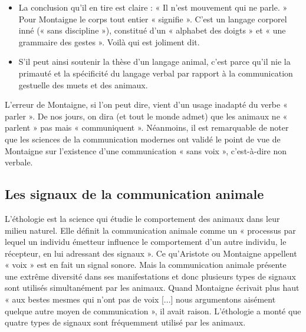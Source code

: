 \begin{itemize}
\item La conclusion qu’il en tire est claire : « Il n’est mouvement qui ne parle. » Pour Montaigne le corps tout entier « signifie ». C’est un langage corporel inné (« sans discipline »), constitué d’un « alphabet des doigts » et « une grammaire des gestes ». Voilà qui est joliment dit.
\item S’il peut ainsi soutenir la thèse d’un langage animal, c’est parce qu’il nie la primauté et la spécificité du langage verbal par rapport à la communication gestuelle des muets et des animaux.
\end{itemize}
L’erreur de Montaigne, si l’on peut dire, vient d’un usage inadapté du verbe « parler ». De nos jours, on dira (et tout le monde admet) que les animaux ne « parlent » pas mais « communiquent ». Néanmoins, il est remarquable de noter que les sciences de la communication modernes ont validé le point de vue de Montaigne sur l’existence d’une communication « sans voix », c’est-à-dire non verbale.
\subsection{Les signaux de la communication animale}
L’éthologie est la science qui étudie le comportement des animaux dans leur milieu naturel. Elle définit la communication animale comme un « processus par lequel un individu émetteur influence le comportement d’un autre individu, le récepteur, en lui adressant des signaux ». Ce qu’Aristote ou Montaigne appellent « voix » est en fait un signal sonore. Mais la communication animale présente une extrême diversité dans ses manifestations et donc plusieurs types de signaux sont utilisés simultanément par les animaux. Quand Montaigne écrivait plus haut « aux bestes mesmes qui n’ont pas de voix [...] nous argumentons aisément quelque autre moyen de communication », il avait raison. L’éthologie a monté que quatre types de signaux sont fréquemment utilisé par les animaux.
